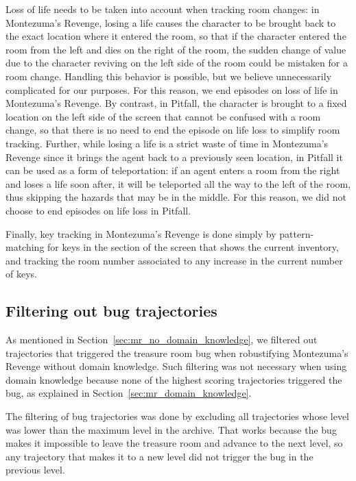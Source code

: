 \documentclass{article}
\begin{document}
Loss of life needs to be taken into account when tracking room changes: in Montezuma's Revenge, losing a life causes the character to be brought back to the exact location where it entered the room, so that if the character entered the room from the left and dies on the right of the room, the sudden change of  value due to the character reviving on the left side of the room could be mistaken for a room change. Handling this behavior is possible, but we believe unnecessarily complicated for our purposes. For this reason, we end episodes on loss of life in Montezuma's Revenge. By contrast, in Pitfall, the character is brought to a fixed location on the left side of the screen that cannot be confused with a room change, so that there is no need to end the episode on life loss to simplify room tracking. Further, while losing a life is a strict waste of time in Montezuma's Revenge since it brings the agent back to a previously seen location, in Pitfall it can be used as a form of teleportation: if an agent enters a room from the right and loses a life soon after, it will be teleported all the way to the left of the room, thus skipping the hazards that may be in the middle. For this reason, we did not choose to end episodes on life loss in Pitfall.

Finally, key tracking in Montezuma's Revenge is done simply by pattern-matching for keys in the section of the screen that shows the current inventory, and tracking the room number associated to any increase in the current number of keys.

\subsection{Filtering out bug trajectories}
\label{sec:filter_out_bug}

As mentioned in Section~\ref{sec:mr_no_domain_knowledge}, we filtered out trajectories that triggered the treasure room bug when robustifying Montezuma's Revenge without domain knowledge. Such filtering was not necessary when using domain knowledge because none of the highest scoring trajectories triggered the bug, as explained in Section~\ref{sec:mr_domain_knowledge}. 

The filtering of bug trajectories was done by excluding all trajectories whose level was lower than the maximum level in the archive. That works because the bug makes it impossible to leave the treasure room and advance to the next level, so any trajectory that makes it to a new level did not trigger the bug in the previous level.
\end{document}
